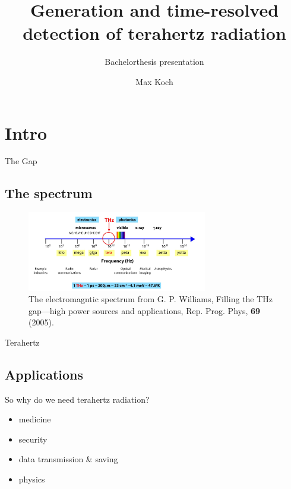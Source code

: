 \documentclass[aspectratio=1610, 9pt]{beamer}
\title{Generation and time-resolved detection of
terahertz radiation}
\subtitle{Bachelorthesis presentation}
\author[M.~Koch]{Max Koch}
\institute[AG Wang]{Arbeitsgruppe Wang \\  Fakultät Physik}
\begin{document}
\maketitle

\section{Intro}

\begin{frame}{The Gap}
  \subsection{The spectrum}
  \begin{center}
    \begin{figure}
      \includegraphics[width=0.7\textwidth]{images/spectrum.png}
      \caption{\textcolor{tugreen}{The electromagntic spectrum} from G. P. Williams, Filling the THz gap—high power sources and applications, Rep. Prog. Phys, \textbf{69} (2005)\nocite{spectrum_pic}.}
    \end{figure}
  \end{center}
\end{frame}


\begin{frame}{Terahertz}
  \subsection{Applications}
  So why do we need terahertz radiation?
  \begin{itemize}
    \item medicine \nocite{THzgap_applications}
    \item security \nocite{thz_explosive_detec}
    \item data transmission \& saving \nocite{communication,datasaving}
    \item physics \nocite{wiki_book}
  \end{itemize}

\end{frame}
\end{document}
